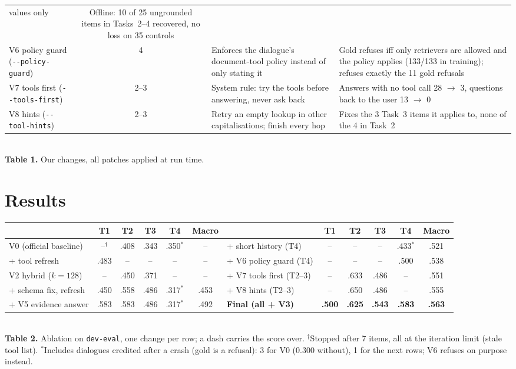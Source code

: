 \documentclass[10pt]{article}
\newcommand{\fl}[1]{\texttt{-{}-#1}}
\begin{document}
\begin{center}
\begin{tabular}{@{}>{\raggedright\arraybackslash}p{}@{\hspace{4pt}}c@{\hspace{5pt}}>{\raggedright\arraybackslash}p{}@{\hspace{6pt}}>{\raggedright\arraybackslash}p{}@{}}
  values only & Offline: 10 of 25 ungrounded items in Tasks~2--4 recovered, no loss on 35 controls \\
V6 policy guard (\fl{policy-guard}) & 4 & Enforces the dialogue's document-tool policy instead of only
  stating it & Gold refuses iff only retrievers are allowed and the policy applies
  (133/133 in training); refuses exactly the 11 gold refusals \\
V7 tools first (\fl{tools-first}) & 2--3 & System rule: try the tools before answering, never ask back
  & Answers with no tool call 28 $\rightarrow$ 3, questions back to the user 13 $\rightarrow$ 0 \\
V8 hints (\fl{tool-hints}) & 2--3 & Retry an empty lookup in other capitalisations; finish every hop
  & Fixes the 3 Task~3 items it applies to, none of the 4 in Task~2 \\
\bottomrule
\end{tabular}\\[0.1em]
{\footnotesize \textbf{Table 1.} Our changes, all patches applied at run time.}
\end{center}

\section{Results}
\begin{center}\footnotesize
\begin{tabular}{@{}lccccc@{\hspace{7pt}}lccccc@{}}
\toprule
 & T1 & T2 & T3 & T4 & Macro & & T1 & T2 & T3 & T4 & Macro \\
\midrule
V0 (official baseline)     & --$^{\dagger}$ & .408 & .343 & .350$^{\ast}$ & -- & + short history (T4) & -- & -- & -- & .433$^{\ast}$ & .521 \\
\quad + tool refresh       & .483 & -- & -- & -- & -- & + V6 policy guard (T4) & -- & -- & -- & .500 & .538 \\
V2 hybrid ($k{=}128$)      & -- & .450 & .371 & -- & -- & + V7 tools first (T2--3) & -- & .633 & .486 & -- & .551 \\
\quad + schema fix, refresh & .450 & .558 & .486 & .317$^{\ast}$ & .453 & + V8 hints (T2--3) & -- & .650 & .486 & -- & .555 \\
\quad + V5 evidence answer & .583 & .583 & .486 & .317$^{\ast}$ & .492 & \textbf{Final (all + V3)} & \textbf{.500} & \textbf{.625} & \textbf{.543} & \textbf{.583} & \textbf{.563} \\
\bottomrule
\end{tabular}\\[0.1em]
{\footnotesize \textbf{Table 2.} Ablation on \texttt{dev-eval}, one change per row; a dash carries the
score over. $^{\dagger}$Stopped after 7 items, all at the iteration limit (stale tool list).
$^{\ast}$Includes dialogues credited after a crash (gold is a refusal): 3 for V0 (0.300 without),
1 for the next rows; V6 refuses on purpose instead.}
\end{center}
\end{document}
